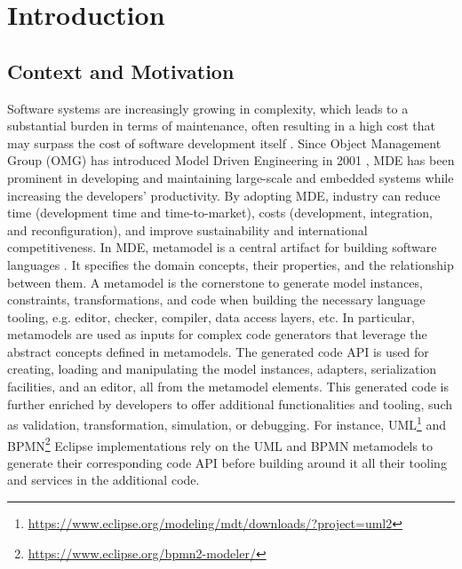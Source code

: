 \chapter{Introduction}
\label{introduction}



\section{Context and Motivation}
Software systems are increasingly growing in complexity, which leads to a substantial burden in terms of maintenance, often resulting in a high cost that may surpass the cost of software development itself \cite{https://doi.org/10.1049/sfw2.12075}.
Since Object Management Group (OMG) has introduced Model Driven Engineering in 2001 \cite{brambilla2017model}, MDE has been prominent in developing and maintaining large-scale and embedded systems while increasing the developers' productivity. By adopting MDE, industry can reduce time (development time and time-to-market), costs (development, integration, and reconfiguration), and improve sustainability and international competitiveness. %
 In MDE, metamodel is a central artifact for building software languages \cite{cabot2012object}. It specifies the domain concepts, their properties, and the relationship between them.
A metamodel is the cornerstone to generate model instances, constraints, transformations, and code when building the necessary language tooling, e.g. editor, checker, compiler, data access layers, etc. 
In particular, metamodels are used as inputs for complex code generators that leverage the abstract concepts defined in metamodels. The generated code API is used for creating, loading and manipulating the model instances, adapters, serialization facilities, and an editor, all from the metamodel elements.
This generated code is further enriched by developers to offer additional functionalities and tooling, such as validation, transformation, simulation, or debugging.
For instance, UML\footnote{\url{https://www.eclipse.org/modeling/mdt/downloads/?project=uml2}}  and BPMN\footnote{\url{https://www.eclipse.org/bpmn2-modeler/}} Eclipse implementations rely on the UML and BPMN metamodels to generate their corresponding code API before building around it all their tooling and services in the additional code.
